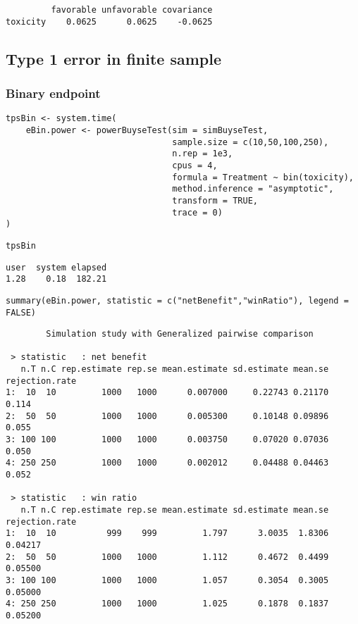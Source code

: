 \documentclass[12pt]{article}
\begin{document}
\begin{verbatim}
         favorable unfavorable covariance
toxicity    0.0625      0.0625    -0.0625
\end{verbatim}

\clearpage

\subsection{Type 1 error in finite sample}
\label{sec:orgdd67d09}

\subsubsection{Binary endpoint}
\label{sec:orgbd64873}
\lstset{language=r,label= ,caption= ,captionpos=b,numbers=none}
\begin{lstlisting}
tpsBin <- system.time(
	eBin.power <- powerBuyseTest(sim = simBuyseTest, 
								 sample.size = c(10,50,100,250), 
								 n.rep = 1e3,
								 cpus = 4,
								 formula = Treatment ~ bin(toxicity), 
								 method.inference = "asymptotic",
								 transform = TRUE,
								 trace = 0)
)
\end{lstlisting}

\lstset{language=r,label= ,caption= ,captionpos=b,numbers=none}
\begin{lstlisting}
tpsBin
\end{lstlisting}

\begin{verbatim}
user  system elapsed 
1.28    0.18  182.21
\end{verbatim}

\lstset{language=r,label= ,caption= ,captionpos=b,numbers=none}
\begin{lstlisting}
summary(eBin.power, statistic = c("netBenefit","winRatio"), legend = FALSE)
\end{lstlisting}

\begin{verbatim}
        Simulation study with Generalized pairwise comparison

 > statistic   : net benefit
   n.T n.C rep.estimate rep.se mean.estimate sd.estimate mean.se rejection.rate
1:  10  10         1000   1000      0.007000     0.22743 0.21170          0.114
2:  50  50         1000   1000      0.005300     0.10148 0.09896          0.055
3: 100 100         1000   1000      0.003750     0.07020 0.07036          0.050
4: 250 250         1000   1000      0.002012     0.04488 0.04463          0.052

 > statistic   : win ratio
   n.T n.C rep.estimate rep.se mean.estimate sd.estimate mean.se rejection.rate
1:  10  10          999    999         1.797      3.0035  1.8306        0.04217
2:  50  50         1000   1000         1.112      0.4672  0.4499        0.05500
3: 100 100         1000   1000         1.057      0.3054  0.3005        0.05000
4: 250 250         1000   1000         1.025      0.1878  0.1837        0.05200
\end{verbatim}
\end{document}
